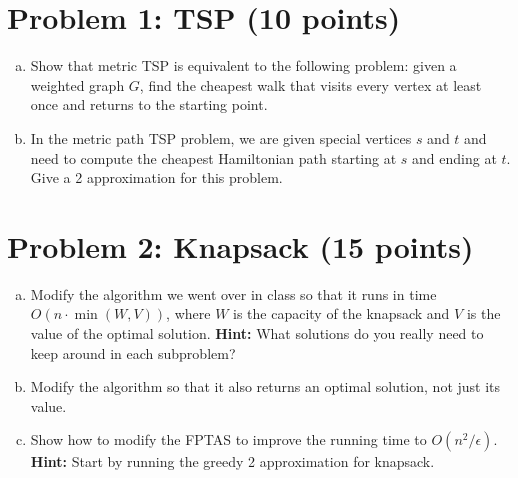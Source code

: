 



\noindent
   \begin{center}
   \end{center}


\section{Problem 1: TSP (10 points)} 

\begin{enumerate}[(a)]
\item Show that metric TSP is equivalent to the following problem: given a weighted graph $G$, find the cheapest walk that visits every vertex at least once and returns to the starting point.
\item In the metric path TSP problem, we are given special vertices $s$ and $t$ and need to compute the cheapest Hamiltonian path starting at $s$ and ending at $t$. Give a 2 approximation for this problem.
\end{enumerate}

\section{Problem 2: Knapsack (15 points)}

\begin{enumerate}[(a)]
\item Modify the algorithm we went over in class so that it runs in time $O(n \cdot \min(W,V))$, where $W$ is the capacity of the knapsack and $V$ is the value of the optimal solution. \textbf{Hint:} What solutions do you really need to keep around in each subproblem?
\item Modify the algorithm so that it also returns an optimal solution, not just its value.
\item Show how to modify the FPTAS to improve the running time to $O(n^2/\epsilon)$. \textbf{Hint:} Start by running the greedy 2 approximation for knapsack.
\end{enumerate}

